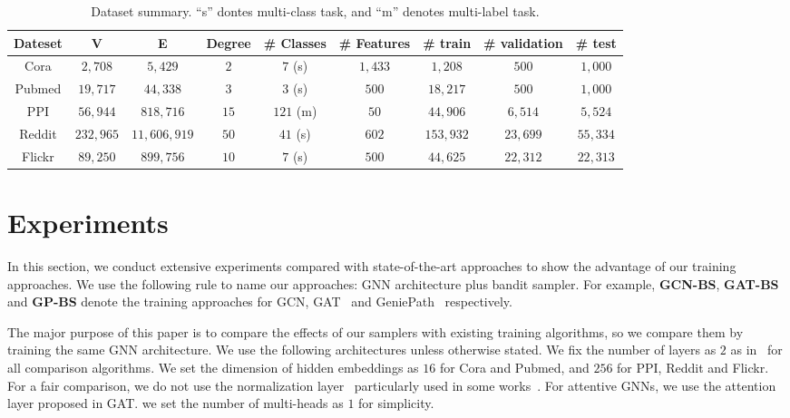 \documentclass{article}
\begin{document}
\setlength{\tabcolsep}{1pt}
{\footnotesize
\begin{table*}
  \centering
  \caption{Dataset summary. ``s'' dontes multi-class task, and ``m'' denotes multi-label task.}
  \label{tb:data}
  \begin{tabular}{ccccccccc}
    Dateset & V & E & Degree &  \# Classes & \# Features & \# train & \# validation & \# test \\
    \midrule
    Cora&  $2,708$ & $5,429$ & $2$ & $7$ (s) & $1,433$ & $1,208$ & $500$ & $1,000$ \\
    Pubmed & $19,717$ & $44,338$ & $3$ & $3$ (s)  & $500$ & $18,217$ & $500$ & $1,000$ \\
    PPI &    $56,944$ & $818,716$ & $15$ & $121$ (m) & $50$ & $44,906$ & $6,514$ & $5,524$\\
    Reddit & $232,965$ & $11,606,919$ & $50$ & $41$ (s) & $602$ & $153,932$ & $23,699$ & $55,334$\\
    Flickr & $89,250$ & $899,756$ & $10$ & $7$ (s) & $500$ & $44,625$ & $22,312$ & $22,313$\\
  \bottomrule
\end{tabular}
\end{table*}
}


\section{Experiments}
In this section, we conduct extensive experiments compared with 
state-of-the-art approaches to show the advantage of our training
approaches. We use the following rule
to name our approaches: GNN architecture plus bandit sampler.
For example, \textbf{GCN-BS}, \textbf{GAT-BS} and 
\textbf{GP-BS} denote the training
approaches for GCN, GAT~\cite{velivckovic2017graph} 
and GeniePath~\cite{liu2019geniepath} respectively.

The major purpose of this paper is to compare the effects
of our samplers with existing training algorithms, so 
we compare them by training the same GNN architecture.
We use the following architectures unless otherwise stated.
We fix the number of layers as $2$ as 
in~\cite{kipf2016semi} for all comparison algorithms.
We set the dimension of hidden embeddings as $16$ for Cora and Pubmed,
and $256$ for PPI, Reddit and Flickr. For a fair comparison, we 
do not use the normalization layer~\cite{ba2016layer}
particularly used in some 
works~\cite{chen2017stochastic,zeng2019graphsaint}.
For attentive GNNs, we use the attention layer proposed 
in GAT. we set the number of multi-heads 
as $1$ for simplicity. 
\end{document}
